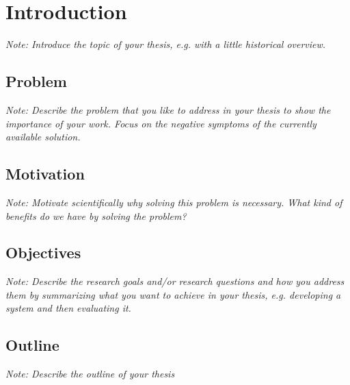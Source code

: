 \documentclass[a4paper,12pt,twoside]{report}
\begin{document}
\begin{acronym}

\end{acronym}


\fancyhead{}
\pagestyle{fancy}
\fancyhead[LE]{\slshape \leftmark}
\fancyhead[RO]{\slshape \rightmark}
\headheight=15pt











\chapter{Introduction}

\textit{Note: Introduce the topic of your thesis, e.g. with a little historical overview.}

\section{Problem}

\textit{Note: Describe the problem that you like to address in your thesis to show the importance of your work. Focus on the negative symptoms of the currently available solution.}

\section{Motivation}

\textit{Note: Motivate scientifically why solving this problem is necessary. What kind of benefits do we have by solving the problem?}

\section{Objectives}

\textit{Note: Describe the research goals and/or research questions and how you address them by summarizing what you want to achieve in your thesis, e.g. developing a system and then evaluating it.}

\section{Outline}

\textit{Note: Describe the outline of your thesis}
\end{document}

